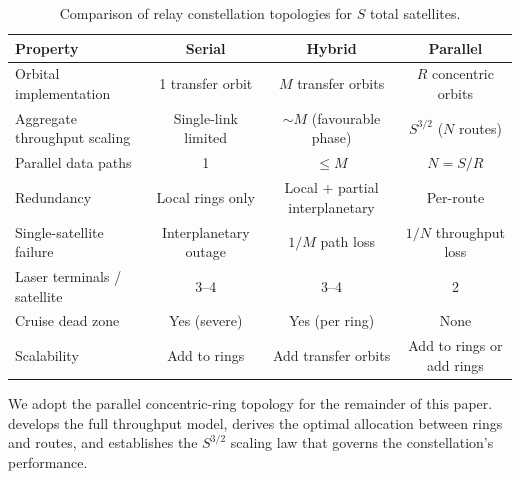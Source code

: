 \begin{table}[t]
  \centering
  \caption{Comparison of relay constellation topologies for $S$ total satellites.}
  \label{tab:topology-comparison}
  \begin{tabular}{@{}lccc@{}}
    \toprule
    \textbf{Property}
      & \textbf{Serial}
      & \textbf{Hybrid}
      & \textbf{Parallel} \\
    \midrule
    Orbital implementation
      & 1 transfer orbit
      & $M$ transfer orbits
      & $R$ concentric orbits \\[3pt]
    Aggregate throughput scaling
      & Single-link limited
      & $\sim\!\!M$ (favourable phase)
      & $S^{3/2}$ ($N$ routes) \\[3pt]
    Parallel data paths
      & 1
      & $\leq M$
      & $N = S/R$ \\[3pt]
    Redundancy
      & Local rings only
      & Local + partial interplanetary
      & Per-route \\[3pt]
    Single-satellite failure
      & Interplanetary outage
      & $1/M$ path loss
      & $1/N$ throughput loss \\[3pt]
    Laser terminals / satellite
      & 3--4
      & 3--4
      & 2 \\[3pt]
    Cruise dead zone
      & Yes (severe)
      & Yes (per ring)
      & None \\[3pt]
    Scalability
      & Add to rings
      & Add transfer orbits
      & Add to rings or add rings \\
    \bottomrule
  \end{tabular}
\end{table}

We adopt the parallel concentric-ring topology for the remainder of this paper.
 develops the full throughput model, derives the optimal
allocation between rings and routes, and establishes the $S^{3/2}$ scaling law
that governs the constellation's performance.
